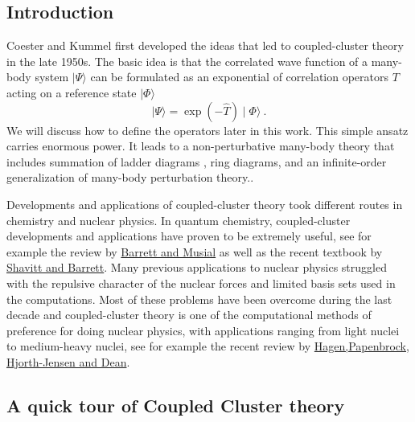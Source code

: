 \subsection{Introduction}
Coester and Kummel first developed the ideas that led to coupled-cluster
theory in the late 1950s. The basic idea is that the correlated wave function
of a many-body system $\mid\Psi\rangle$
can be formulated as an exponential of correlation
operators $T$ acting on a reference state $\mid\Phi\rangle$
\[
\mid\Psi\rangle = \exp\left(-\hat{T}\right)\mid\Phi\rangle\ .
\]
We will discuss how to define the operators later in this work. This simple
ansatz carries enormous power. It leads to a non-perturbative many-body
theory that includes summation of ladder diagrams , ring
diagrams, and an infinite-order
generalization of many-body perturbation theory..

Developments and applications of coupled-cluster theory took different
routes in chemistry and nuclear physics. In quantum chemistry,
coupled-cluster developments and applications have proven to be
extremely useful, see for example the review
by \href{{http://journals.aps.org/rmp/abstract/10.1103/RevModPhys.79.291}}{Barrett
and Musial} as well as the recent textbook
by \href{{http://www.cambridge.org/fr/academic/subjects/chemistry/physical-chemistry/many-body-methods-chemistry-and-physics-mbpt-and-coupled-cluster-theory?format=HB}}{Shavitt
and Barrett}.  Many previous applications to nuclear physics struggled
with the repulsive character of the nuclear forces and limited basis
sets used in the computations. Most of these problems have been
overcome during the last decade and coupled-cluster theory is one of
the computational methods of preference for doing nuclear physics,
with applications ranging from light nuclei to medium-heavy nuclei,
see for example the recent review
by \href{{http://iopscience.iop.org/0034-4885/77/9/096302}}{Hagen,Papenbrock, Hjorth-Jensen and Dean}.


\subsection{A quick tour of Coupled Cluster theory}

